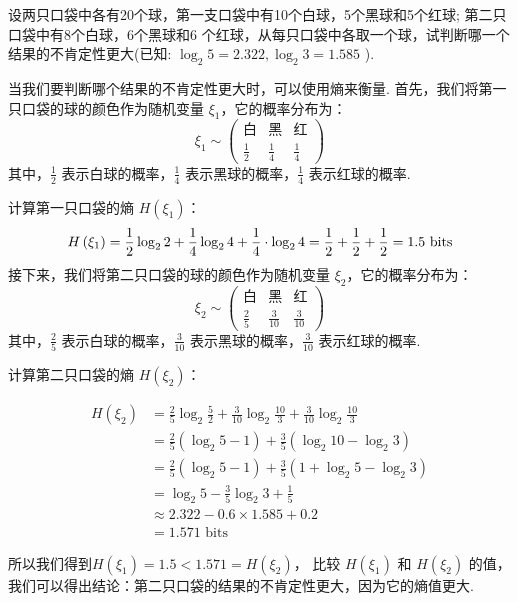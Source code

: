 \begin{tcolorbox}[breakable,colback=blue!5!white,colframe=blue!75!black,
 title= 解答题]
 设两只口袋中各有20个球，第一支口袋中有10个白球，5个黑球和5个红球; 第二只口袋中有8个白球，6个黑球和6 个红球，从每只口袋中各取一个球，试判断哪一个结果的不肯定性更大(已知: $ \log _{2} 5=2.322, \log _{2} 3=1.585 $ ).
\tcblower

当我们要判断哪个结果的不肯定性更大时，可以使用熵来衡量.
首先，我们将第一只口袋的球的颜色作为随机变量 $\xi_1$，它的概率分布为：
$$
\xi_1 \sim \left(\begin{array}{ccc}\text{白} & \text{黑} & \text{红} \\ \frac{1}{2} & \frac{1}{4} & \frac{1}{4}\end{array}\right)
$$
其中，$\frac{1}{2}$ 表示白球的概率，$\frac{1}{4}$ 表示黑球的概率，$\frac{1}{4}$ 表示红球的概率.

计算第一只口袋的熵 $H(\xi_1)$：
$$ H\left(\xi_{1}\right)=\frac{1}{2} \log _{2} 2+\frac{1}{4} \log _{2} 4+\frac{1}{4} \cdot \log _{2} 4 \\ =\frac{1}{2}+\frac{1}{2}+\frac{1}{2}=1.5  \text{ bits}
$$
接下来，我们将第二只口袋的球的颜色作为随机变量 $\xi_2$，它的概率分布为：
$$
\xi_2 \sim \left(\begin{array}{ccc}\text{白} & \text{黑} & \text{红} \\ \frac{2}{5} & \frac{3}{10} & \frac{3}{10}\end{array}\right)
$$
其中，$\frac{2}{5}$ 表示白球的概率，$\frac{3}{10}$ 表示黑球的概率，$\frac{3}{10}$ 表示红球的概率.

计算第二只口袋的熵 $H(\xi_2)$：

$$
\begin{aligned}
H\left(\xi_{2}\right) & =\frac{2}{5} \log _{2} \frac{5}{2}+\frac{3}{10} \log _{2} \frac{10}{3}+\frac{3}{10} \log _{2} \frac{10}{3} \\
&=\frac{2}{5}\left(\log _{2} 5-1\right)+\frac{3}{5}\left(\log _{2} 10-\log _{2} 3\right) \\
&=\frac{2}{5}\left(\log _{2} 5-1\right)+\frac{3}{5}\left(1+\log _{2} 5-\log _{2} 3\right) \\
&  =\log _{2} 5-\frac{3}{5} \log _{2} 3+\frac{1}{5} \\
& \approx 2.322-0.6\times 1.585+0.2\\
& =1.571 \text { bits }
\end{aligned}
$$

所以我们得到$H(\xi_1)=1.5<1.571=H(\xi_2)$，
比较 $H(\xi_1)$ 和 $H(\xi_2)$ 的值，我们可以得出结论：第二只口袋的结果的不肯定性更大，因为它的熵值更大. 



\end{tcolorbox}



